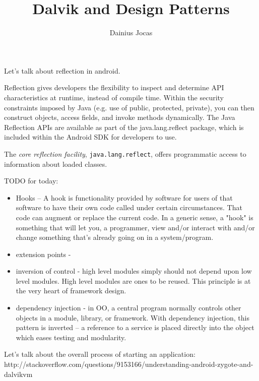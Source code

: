 \documentclass[10pt,a4paper,draft]{article}
\author{Dainius Jocas}
\title{Dalvik and Design Patterns}
\begin{document}
Let's talk about reflection in android.

Reflection gives developers the flexibility to inspect and determine API characteristics at runtime, instead of compile time. Within the security constraints imposed by Java (e.g. use of public, protected, private), you can then construct objects, access fields, and invoke methods dynamically. The Java Reflection APIs are available as part of the java.lang.reflect package, which is included within the Android SDK for developers to use.

The \textit{core reflection facility}, \texttt{java.lang.reflect}, offers programmatic access to
information about loaded classes.

TODO for today:
\begin{itemize}
  \item Hooks -- A hook is functionality provided by software for users of that software to have their own code called under certain circumstances. That code can augment or replace the current code. In a generic sense, a "hook" is something that will let you, a programmer, view and/or interact with and/or change something that's already going on in a system/program.
  \item extension points - 
  \item inversion of control - high level modules simply should not depend upon low level modules. High level modules are ones to be reused. This principle is at the very heart of framework design.
  \item dependency injection - in OO, a central program normally controls other objects in a module, library, or framework. With dependency injection, this pattern is inverted -- a reference to a service is placed directly into the object which eases testing and modularity.
\end{itemize}

Let's talk about the overall process of starting an application: http://stackoverflow.com/questions/9153166/understanding-android-zygote-and-dalvikvm
\end{document}
